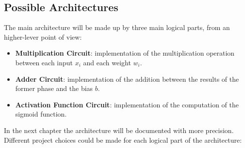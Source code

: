 \subsection{Possible Architectures}

The main architecture will be made up by three main logical parts, from an higher-lever point of view:
\begin{itemize}
	\item \textbf{Multiplication Circuit}: implementation of the multiplication operation between each input $x_{i}$ and each weight $w_{i}$.
	\item \textbf{Adder Circuit}: implementation of the addition between the results of the former phase and the bias $b$.
	\item \textbf{Activation Function Circuit}: implementation of the computation of the sigmoid function.
\end{itemize}

In the next chapter the architecture will be documented with more precision.
Different project choices could be made for each logical part of the architecture:

